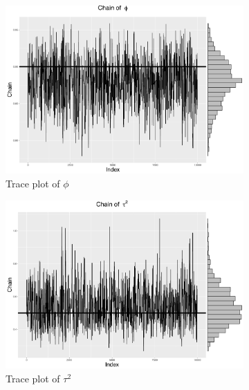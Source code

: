 \begin{figure}[h]
\centering
 \begin{subfigure}[b]{0.32\textwidth}
     \includegraphics[width=\textwidth]{Chapters/05MCMCOU/plots/linear_phi.pdf}
     \caption{Trace plot of $\phi$}
\end{subfigure}
\begin{subfigure}[b]{0.32\textwidth}
    \includegraphics[width=\textwidth]{Chapters/05MCMCOU/plots/linear_tau2.pdf}
     \caption{Trace plot of $\tau^2$}
\end{subfigure}
\begin{subfigure}[b]{0.32\textwidth} \

\end{subfigure}
\end{figure}
